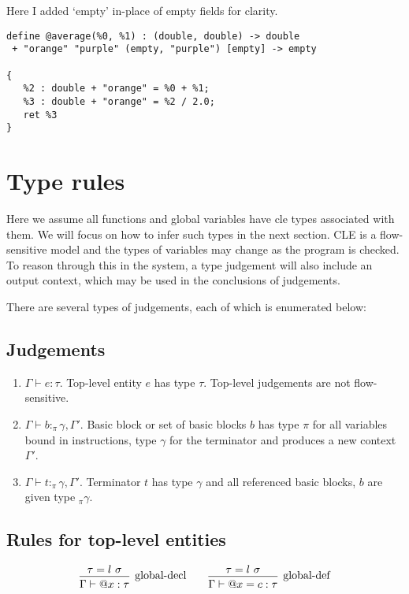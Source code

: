 \documentclass{article}
\begin{document}
Here I added `empty' in-place of empty fields for clarity. 
\begin{verbatim}
define @average(%0, %1) : (double, double) -> double
 + "orange" "purple" (empty, "purple") [empty] -> empty
      
{
   %2 : double + "orange" = %0 + %1;
   %3 : double + "orange" = %2 / 2.0;
   ret %3
}
\end{verbatim}

\section{Type rules}
Here we assume all functions and global variables have cle types associated with them.  We will focus on how to infer such types in the next section.
CLE is a flow-sensitive model and the types of variables may change as the program is checked.
To reason through this in the system, a type judgement will also include an output context, which may be used in the conclusions of judgements.

There are several types of judgements, each of which is enumerated below:

\subsection{Judgements}
\begin{enumerate}
    \item $\Gamma \vdash e : \tau$. 
    Top-level entity $e$ has type $\tau$. Top-level judgements are not flow-sensitive. 
    \item $\Gamma \vdash b :_\pi \gamma, \Gamma'$. 
    Basic block or set of basic blocks $b$ has type $\pi$ for all variables bound in instructions, type $\gamma$ for the terminator and produces a new context $\Gamma'$.
    \item $\Gamma \vdash t :_\pi \gamma, \Gamma'$. 
    Terminator $t$ has type $\gamma$ and all referenced basic blocks, $b$ are given type $_\pi \gamma$.
\end{enumerate}

\subsection{Rules for top-level entities}

\[    
\begin{prooftree}
    \hypo{\tau = l\ \sigma}
    \infer1[global-decl]{\Gamma \vdash @x : \tau}
\end{prooftree}
\qquad
\begin{prooftree}
    \hypo{\tau = l\ \sigma}
    \infer1[global-def]{\Gamma \vdash @x = c : \tau}
\end{prooftree}
\]
\end{document}
